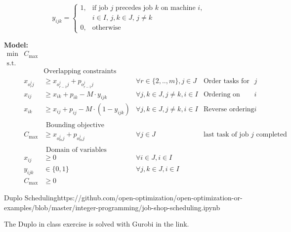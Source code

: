 {$$
y_{ijk} = \begin{cases} 1, & \text{if job } j \text{ precedes job } k \text{ on machine } i \text{,}\\ & i \in I \text{, } j, k  \in J \text{, } j \neq k \\ 0, & \text{otherwise} \end{cases}
$$


\noindent \textbf{Model:}
\begin{subequations}
\begin{equation}
\begin{array}{rrlrr}
\min 
               & C_{\max} \\
\text{s.t.} \\
&& \text{Overlapping constraints}\\
&            x_{o^{j}_{r}j} &  \geq x_{o^{j}_{r-1}j} +p_{o^{j}_{r-1}j} & \forall r \in \{2,..,m\}, j \in {J} & \text{Order tasks for job $j$} \\
             &      x_{ij}     & \geq x_{ik} + p_{ik} - M \cdot y_{ijk} & \forall j,k \in {J}, j \neq k, i \in {I} & \text{Ordering on machine $i$} \\
              &     x_{ik}     & \geq x_{ij} + p_{ij} - M \cdot (1-y_{ijk}) & \forall j,k \in {J}, j \neq k,i \in {I} & \text{Reverse ordering on machine $i$}\\
              \\
           &   & \text{ Bounding objective}\\
            &       C_{\max}          & \geq x_{o^{j}_{m}j} + p_{o^{j}_{m}j} & \forall j \in {J} & \text{last task of job $j$ completed before end}\\
            \\
            && \text{ Domain of variables}\\
            &      x_{ij}      & \geq 0 & \forall i \in {J}, i \in {I} \\
           &       y_{ijk}     & \in \{0,1\} & \forall j,k \in {J}, i \in {I} \\
          &        C_{\max} & \geq 0
              \end{array}
              \end{equation}
\end{subequations}
\begin{examplewithcode}{Duplo Scheduling}{https://github.com/open-optimization/open-optimization-or-examples/blob/master/integer-programming/job-shop-scheduling.ipynb}

The Duplo in class exercise is solved with Gurobi in the link.


\end{examplewithcode}}
